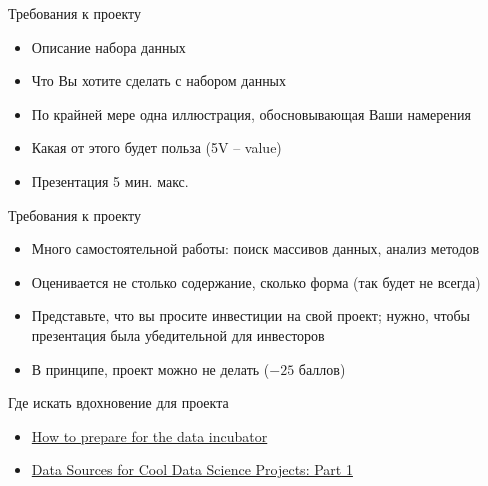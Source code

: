 \documentclass[landscape]{slides}
\begin{document}
\begin{slide}
Требования к проекту
\begin{itemize}
\item Описание набора данных
\item Что Вы хотите сделать с набором данных
\item По крайней мере одна иллюстрация, обосновывающая Ваши намерения
\item Какая от этого будет польза (5V -- value)
\item Презентация 5 мин. макс.
\end{itemize}
\end{slide}

\begin{slide}
Требования к проекту
\begin{itemize}
\item Много самостоятельной работы: поиск массивов данных, анализ методов
\item Оценивается не столько содержание, сколько форма (так будет не всегда)
\item Представьте, что вы просите инвестиции на свой проект; нужно, чтобы презентация была убедительной для инвесторов
\item В принципе, проект можно не делать ($-25$ баллов)
\end{itemize}
\end{slide}

\begin{slide}
Где искать вдохновение для проекта
\begin{itemize}
\item \href{http://blog.thedataincubator.com/2014/09/how-to-prepare-for-the-data-incubator/}{How to prepare for the data incubator}
\item \href{http://blog.thedataincubator.com/2014/10/data-sources-for-cool-data-science-projects-part-1/}{Data Sources for Cool Data Science Projects: Part 1}
\end{itemize}
\end{slide}
\end{document}
